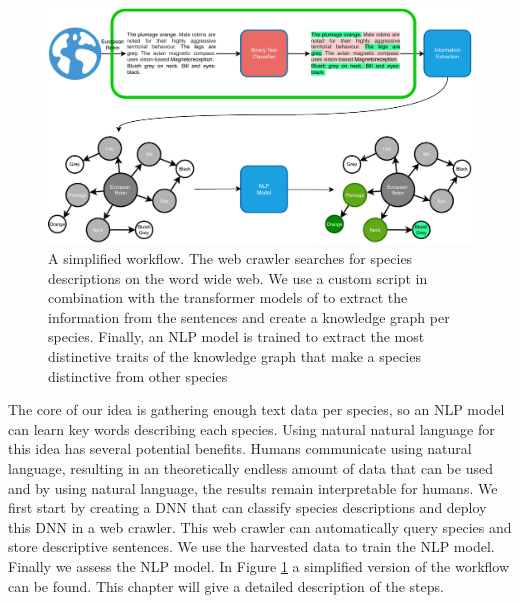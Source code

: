 \documentclass[a4paper, 12pt, oneside]{book} %
\begin{document}
\begin{figure} [htpb]
    \centering
    \includegraphics[width=\textwidth]{figures/workflow_v5.pdf}
    \caption[Workflow]{A simplified workflow. The web crawler searches for species descriptions on the word wide web. We use a custom script in combination with the transformer models of \textcite{wolf_huggingfaces_2020} to extract the information from the sentences and create a knowledge graph per species. Finally, an NLP model is trained to extract the most distinctive traits of the knowledge graph that make a species distinctive from other species}
    \label{fig:workflow}
\end{figure}

The core of our idea is gathering enough text data per species, so an NLP model can learn key words describing each species.
Using natural natural language for this idea has several potential benefits.
Humans communicate using natural language, resulting in an theoretically endless amount of data that can be used and by using natural language, the results remain interpretable for humans.
We first start by creating a DNN that can classify species descriptions and deploy this DNN in a web crawler.
This web crawler can automatically query species and store descriptive sentences.
We use the harvested data to train the NLP model.
Finally we assess the NLP model.
In Figure \ref{fig:workflow} a simplified version of the workflow can be found.
This chapter will give a detailed description of the steps.
\end{document}

